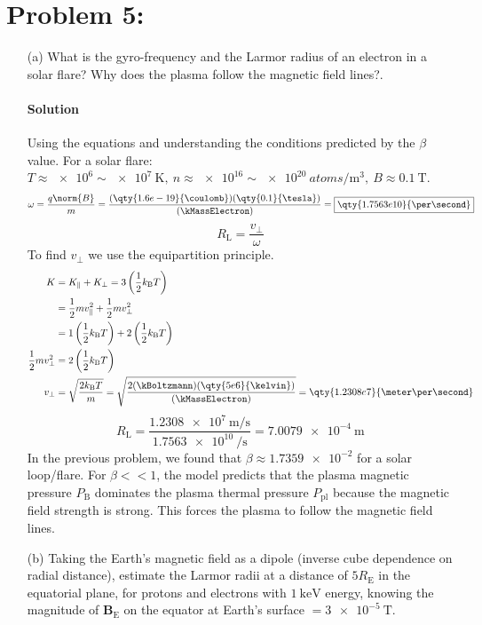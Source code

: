 \documentclass{article}
\begin{document}
	\section*{Problem 5: }
	\begin{enumerate}
		\item[(a)] What is the gyro-frequency and the Larmor radius of an electron in a solar flare? Why does the plasma follow the magnetic field lines?.
		\paragraph{Solution} Using the equations and understanding the conditions predicted by the $\beta$ value. For a solar flare: $ T \approx \num{e6} \sim \qty{e7}{\kelvin},\ n \approx \num{e16} \sim \qty{e20}{atoms\per\meter\cubed},\ B \approx \qty{0.1}{\tesla} $. \\
		\[
			\omega = \frac{q\norm{B}}{m} = \frac{(\qty{1.6e-19}{\coulomb})(\qty{0.1}{\tesla})}{(\kMassElectron)} = \boxed{\qty{1.7563e10}{\per\second}}
		\]
		\[
			R_\mathrm{L} = \frac{v_\perp}{\omega}
		\]
		To find $v_\perp$ we use the equipartition principle. 
		\begin{equation*}
			\begin{split}
				K &= K_\parallel + K_\perp = 3 \left( \frac{1}{2} k_\mathrm{B} T \right) \\
				&= \frac{1}{2} m v^2_\parallel + \frac{1}{2} m v^2_\perp \\
				&= 1 \left( \frac{1}{2} k_\mathrm{B} T \right) + 2 \left( \frac{1}{2} k_\mathrm{B} T \right) \\
				\frac{1}{2} m v^2_\perp & = 2 \left( \frac{1}{2} k_\mathrm{B} T \right) \\
				v_\perp &= \sqrt{ \frac{2 k_\mathrm{B} T}{m} } = \sqrt{ \frac{2 (\kBoltzmann)(\qty{5e6}{\kelvin})}{(\kMassElectron)} } = \qty{1.2308e7}{\meter\per\second}
			\end{split}
		\end{equation*}
		\[
			R_\mathrm{L} = \frac{\qty{1.2308e7}{\meter\per\second}}{\qty{1.7563e10}{\per\second}} = \boxed{\qty{7.0079e-4}{\meter}}
		\]
		In the previous problem, we found that $\beta \approx \num{1.7359e-2}$ for a solar loop/flare. For $\beta << 1$, the model predicts that the plasma magnetic pressure $P_\mathrm{B}$ dominates the plasma thermal pressure $P_\mathrm{pl}$ because the magnetic field strength is strong. This forces the plasma to follow the magnetic field lines.
		
		
		\item[(b)] Taking the Earth’s magnetic field as a dipole (inverse cube dependence on radial distance), estimate the Larmor radii at a distance of $5R_\mathrm{E}$ in the equatorial plane, for protons and electrons with $\qty{1}{\kilo\electronvolt}$ energy, knowing the magnitude of $\bm{B}_\mathrm{E}$ on the equator at Earth’s surface $=\qty{3e-5}{\tesla}$.		

\end{enumerate}
\end{document}

